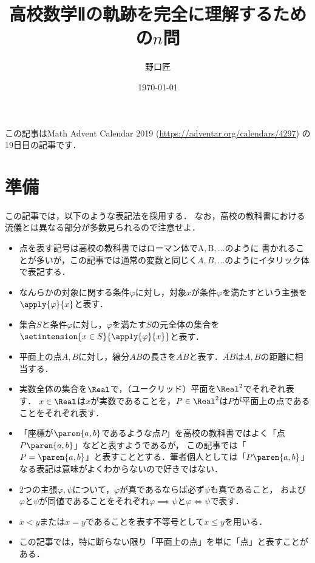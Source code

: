 \documentclass[11pt,a4paper]{ltjsarticle}
\title{高校数学Ⅱの軌跡を完全に理解するための$n$問}
\author{野口匠}
\affil{高知工科大学大学院工学研究科}
\date{\today}
\newcommand*{\length}[1]{\overline{#1}}
\newcommand*{\equivalent}{\Longleftrightarrow}
\newcommand*{\coord}[1]{\paren{#1}}
\theoremstyle{definition}
\begin{document}
%
\maketitle

この記事はMath Advent Calendar 2019 (\url{https://adventar.org/calendars/4297}) の19日目の記事です．

\section{準備} \label{sec:pre}

この記事では，以下のような表記法を採用する．
なお，高校の教科書における流儀とは異なる部分が多数見られるので注意せよ．

\begin{itemize}
  \item 点を表す記号は高校の教科書ではローマン体で$\mathrm{A}, \mathrm{B}, \dotsc$のように
    書かれることが多いが，この記事では通常の変数と同じく$A,B, \dotsc$のようにイタリック体で表記する．
  \item なんらかの対象に関する条件$\varphi$に対し，対象$x$が条件$\varphi$を満たすという主張を$\apply{\varphi}{x}$と表す．
  \item 集合$S$と条件$\varphi$に対し，$\varphi$を満たす$S$の元全体の集合を$\setintension{x \in S}{\apply{\varphi}{x}}$と表す．
  \item 平面上の点$A,B$に対し，線分$AB$の長さを$\length{AB}$と表す．$\length{AB}$は$A,B$の距離に相当する．
  \item 実数全体の集合を$\Real$で，（ユークリッド）平面を$\Real ^2$でそれぞれ表す．
    $x \in \Real$は$x$が実数であることを，$P \in \Real ^2$は$P$が平面上の点であることをそれぞれ表す．
  \item 「座標が$\coord{a,b}$であるような点$P$」を高校の教科書ではよく「点$P{\coord{a,b}}$」などと表すようであるが，
    この記事では「$P = \coord{a,b}$」と表すこととする．筆者個人としては「$P{\coord{a,b}}$」なる表記は意味がよくわからないので好きではない．
  \item 2つの主張$\varphi, \psi$について，$\varphi$が真であるならば必ず$\psi$も真であること，
    および$\varphi$と$\psi$が同値であることをそれぞれ$\varphi \implies \psi$と$\varphi \equivalent \psi$で表す．
  \item $x < y$または$x = y$であることを表す不等号として$x \leq y$を用いる．
  \item この記事では，特に断らない限り「平面上の点」を単に「点」と表すことがある．
\end{itemize}
\end{document}
